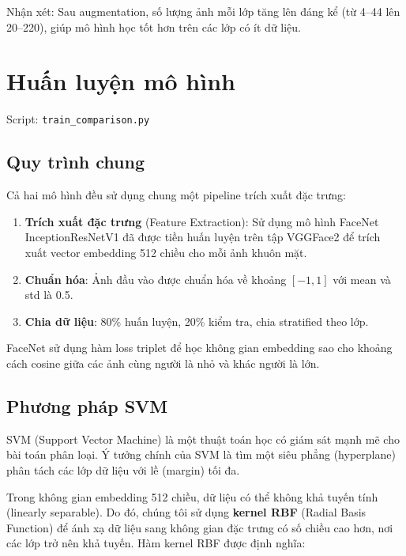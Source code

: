 \documentclass[12pt,a4paper]{article}
\begin{document}
Nhận xét: Sau augmentation, số lượng ảnh mỗi lớp tăng lên đáng kể (từ 4--44 lên 20--220), giúp mô hình học tốt hơn trên các lớp có ít dữ liệu.

\newpage

\section{Huấn luyện mô hình}
\label{sec:training}

Script: \texttt{train\_comparison.py}

\subsection{Quy trình chung}
\label{subsec:pipeline}

Cả hai mô hình đều sử dụng chung một pipeline trích xuất đặc trưng:
\begin{enumerate}
    \item \textbf{Trích xuất đặc trưng} (Feature Extraction): Sử dụng mô hình FaceNet InceptionResNetV1 \cite{facenet} đã được tiền huấn luyện trên tập VGGFace2 \cite{vggface2} để trích xuất vector embedding 512 chiều cho mỗi ảnh khuôn mặt.
    \item \textbf{Chuẩn hóa}: Ảnh đầu vào được chuẩn hóa về khoảng $[-1, 1]$ với mean và std là 0.5.
    \item \textbf{Chia dữ liệu}: 80\% huấn luyện, 20\% kiểm tra, chia stratified theo lớp.
\end{enumerate}

FaceNet sử dụng hàm loss triplet để học không gian embedding sao cho khoảng cách cosine giữa các ảnh cùng người là nhỏ và khác người là lớn.

\subsection{Phương pháp SVM}
\label{subsec:svm_method}

SVM (Support Vector Machine) là một thuật toán học có giám sát mạnh mẽ cho bài toán phân loại. Ý tưởng chính của SVM là tìm một siêu phẳng (hyperplane) phân tách các lớp dữ liệu với lề (margin) tối đa.

Trong không gian embedding 512 chiều, dữ liệu có thể không khả tuyến tính (linearly separable). Do đó, chúng tôi sử dụng \textbf{kernel RBF} (Radial Basis Function) để ánh xạ dữ liệu sang không gian đặc trưng có số chiều cao hơn, nơi các lớp trở nên khả tuyến. Hàm kernel RBF được định nghĩa:
\end{document}
